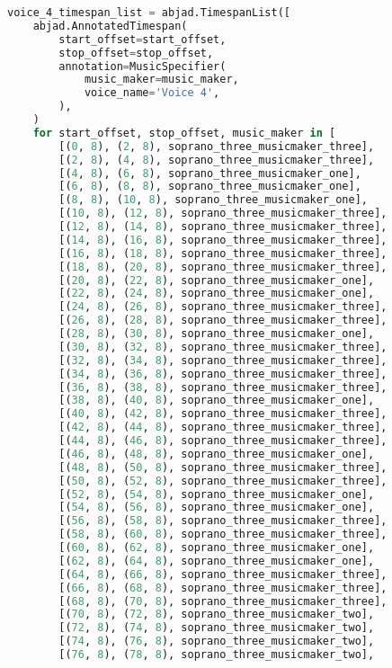 \begin{lstlisting}[language=Python, caption=Invocation Source Code]
voice_4_timespan_list = abjad.TimespanList([
    abjad.AnnotatedTimespan(
        start_offset=start_offset,
        stop_offset=stop_offset,
        annotation=MusicSpecifier(
            music_maker=music_maker,
            voice_name='Voice 4',
        ),
    )
    for start_offset, stop_offset, music_maker in [
        [(0, 8), (2, 8), soprano_three_musicmaker_three],
        [(2, 8), (4, 8), soprano_three_musicmaker_three],
        [(4, 8), (6, 8), soprano_three_musicmaker_one],
        [(6, 8), (8, 8), soprano_three_musicmaker_one],
        [(8, 8), (10, 8), soprano_three_musicmaker_one],
        [(10, 8), (12, 8), soprano_three_musicmaker_three],
        [(12, 8), (14, 8), soprano_three_musicmaker_three],
        [(14, 8), (16, 8), soprano_three_musicmaker_three],
        [(16, 8), (18, 8), soprano_three_musicmaker_three],
        [(18, 8), (20, 8), soprano_three_musicmaker_three],
        [(20, 8), (22, 8), soprano_three_musicmaker_one],
        [(22, 8), (24, 8), soprano_three_musicmaker_one],
        [(24, 8), (26, 8), soprano_three_musicmaker_three],
        [(26, 8), (28, 8), soprano_three_musicmaker_three],
        [(28, 8), (30, 8), soprano_three_musicmaker_one],
        [(30, 8), (32, 8), soprano_three_musicmaker_three],
        [(32, 8), (34, 8), soprano_three_musicmaker_three],
        [(34, 8), (36, 8), soprano_three_musicmaker_three],
        [(36, 8), (38, 8), soprano_three_musicmaker_three],
        [(38, 8), (40, 8), soprano_three_musicmaker_one],
        [(40, 8), (42, 8), soprano_three_musicmaker_three],
        [(42, 8), (44, 8), soprano_three_musicmaker_three],
        [(44, 8), (46, 8), soprano_three_musicmaker_three],
        [(46, 8), (48, 8), soprano_three_musicmaker_one],
        [(48, 8), (50, 8), soprano_three_musicmaker_three],
        [(50, 8), (52, 8), soprano_three_musicmaker_three],
        [(52, 8), (54, 8), soprano_three_musicmaker_one],
        [(54, 8), (56, 8), soprano_three_musicmaker_one],
        [(56, 8), (58, 8), soprano_three_musicmaker_three],
        [(58, 8), (60, 8), soprano_three_musicmaker_three],
        [(60, 8), (62, 8), soprano_three_musicmaker_one],
        [(62, 8), (64, 8), soprano_three_musicmaker_one],
        [(64, 8), (66, 8), soprano_three_musicmaker_three],
        [(66, 8), (68, 8), soprano_three_musicmaker_three],
        [(68, 8), (70, 8), soprano_three_musicmaker_three],
        [(70, 8), (72, 8), soprano_three_musicmaker_two],
        [(72, 8), (74, 8), soprano_three_musicmaker_two],
        [(74, 8), (76, 8), soprano_three_musicmaker_two],
        [(76, 8), (78, 8), soprano_three_musicmaker_two],

\end{lstlisting}

